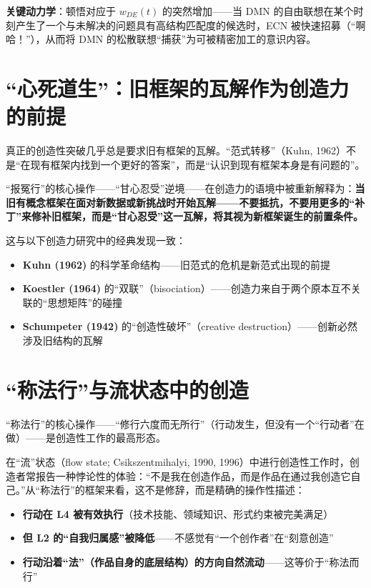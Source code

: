 \documentclass[UTF8,12pt,a4paper]{ctexart}
\begin{document}
\textbf{关键动力学}：顿悟对应于 $w_{DE}(t)$ 的突然增加——当 DMN 的自由联想在某个时刻产生了一个与未解决的问题具有高结构匹配度的候选时，ECN 被快速招募（``啊哈！''），从而将 DMN 的松散联想``捕获''为可被精密加工的意识内容。

\section{``心死道生''：旧框架的瓦解作为创造力的前提}

真正的创造性突破几乎总是要求旧有框架的瓦解。``范式转移''（Kuhn, 1962）不是``在现有框架内找到一个更好的答案''，而是``认识到现有框架本身是有问题的''。

``报冤行''的核心操作——``甘心忍受''逆境——在创造力的语境中被重新解释为：\textbf{当旧有概念框架在面对新数据或新挑战时开始瓦解——不要抵抗，不要用更多的``补丁''来修补旧框架，而是``甘心忍受''这一瓦解，将其视为新框架诞生的前置条件。}

这与以下创造力研究中的经典发现一致：
\begin{itemize}[nosep]
    \item \textbf{Kuhn (1962)} 的科学革命结构——旧范式的危机是新范式出现的前提
    \item \textbf{Koestler (1964)} 的``双联''（bisociation）——创造力来自于两个原本互不关联的``思想矩阵''的碰撞
    \item \textbf{Schumpeter (1942)} 的``创造性破坏''（creative destruction）——创新必然涉及旧结构的瓦解
\end{itemize}

\section{``称法行''与流状态中的创造}

``称法行''的核心操作——``修行六度而无所行''（行动发生，但没有一个``行动者''在做）——是创造性工作的最高形态。

在``流''状态（flow state; Csikszentmihalyi, 1990, 1996）中进行创造性工作时，创造者常报告一种悖论性的体验：``不是我在创造作品，而是作品在通过我创造它自己。''从``称法行''的框架来看，这不是修辞，而是精确的操作性描述：

\begin{itemize}[nosep]
    \item \textbf{行动在 L4 被有效执行}（技术技能、领域知识、形式约束被完美满足）
    \item \textbf{但 L2 的``自我归属感''被降低}——不感觉有``一个创作者''在``刻意创造''
    \item \textbf{行动沿着``法''（作品自身的底层结构）的方向自然流动}——这等价于``称法而行''
\end{itemize}
\end{document}
